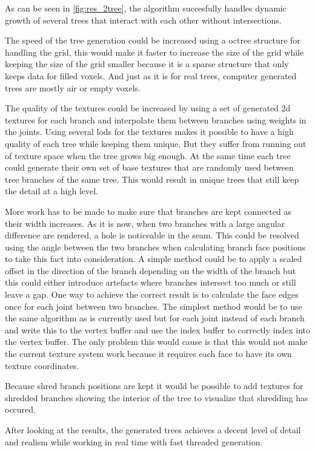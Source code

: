 \documentclass[11pt]{article} %
\begin{document}
As can be seen in \autoref{fig:res_2tree}, the algorithm succesfully handles dynamic growth of several trees that interact with each other without intersections.

The speed of the tree generation could be increased using a octree structure for handling the grid, this would make it faster to increase the size of the grid while keeping the size of the grid smaller because it is a sparse structure that only keeps data for filled voxels.
And just as it is for real trees, computer generated trees are mostly air or empty voxels.

The quality of the textures could be increased by using a set of generated 2d textures for each branch and interpolate them between branches using weights in the joints.
Using several lods for the textures makes it possible to have a high quality of each tree while keeping them unique.
But they suffer from running out of texture space when the tree grows big enough.
At the same time each tree could generate their own set of base textures that are randomly used between tree branches of the same tree.
This would result in unique trees that still keep the detail at a high level.

More work has to be made to make sure that branches are kept connected as their width increases.
As it is now, when two branches with a large angular difference are rendered, a hole is noticeable in the seam.
This could be resolved using the angle between the two branches when calculating branch face positions to take this fact into consideration.
A simple method could be to apply a scaled offset in the direction of the branch depending on the width of the branch but this could either introduce artefacts where branches intersect too much or still leave a gap.
One way to achieve the correct result is to calculate the face edges once for each joint between two branches.
The simplest method would be to use the same algorithm as is currently used but for each joint instead of each branch and write this to the vertex buffer and use the index buffer to correctly index into the vertex buffer.
The only problem this would cause is that this would not make the current texture system work because it requires each face to have its own texture coordinates.

Because shred branch positions are kept it would be possible to add textures for shredded branches showing the interior of the tree to visualize that shredding has occured.

After looking at the results, the generated trees achieves a decent level of detail and realism while working in real time with fast threaded generation.



\end{document}
